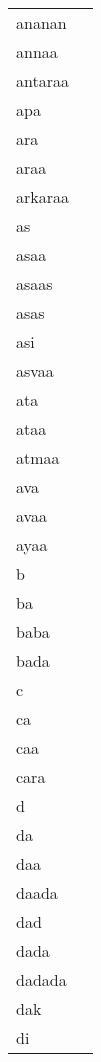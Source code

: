 \documentclass{article}
\begin{document}
\begin{longtable}{|l|p{}|}
ananan & \textIndus{} \\
annaa & \textIndus{ } \\
antaraa & \textIndus{} \\
apa & \textIndus{} \\
ara & \textIndus{  } \\
araa & \textIndus{ } \\
arkaraa & \textIndus{} \\
as & \textIndus{                                               } \\
asaa & \textIndus{       } \\
asaas & \textIndus{   } \\
asas & \textIndus{} \\
asi & \textIndus{ } \\
asvaa & \textIndus{} \\
ata & \textIndus{  } \\
ataa & \textIndus{     } \\
atmaa & \textIndus{} \\
ava & \textIndus{} \\
avaa & \textIndus{} \\
ayaa & \textIndus{ } \\
b & \textIndus{      } \\
ba & \textIndus{             } \\
baba & \textIndus{ } \\
bada & \textIndus{} \\
c & \textIndus{      } \\
ca & \textIndus{        } \\
caa & \textIndus{} \\
cara & \textIndus{} \\
d & \textIndus{             } \\
da & \textIndus{                                        } \\
daa & \textIndus{    } \\
daada & \textIndus{ } \\
dad & \textIndus{} \\
dada & \textIndus{  } \\
dadada & \textIndus{} \\
dak & \textIndus{} \\
di & \textIndus{} \\

\end{longtable}
\end{document}
